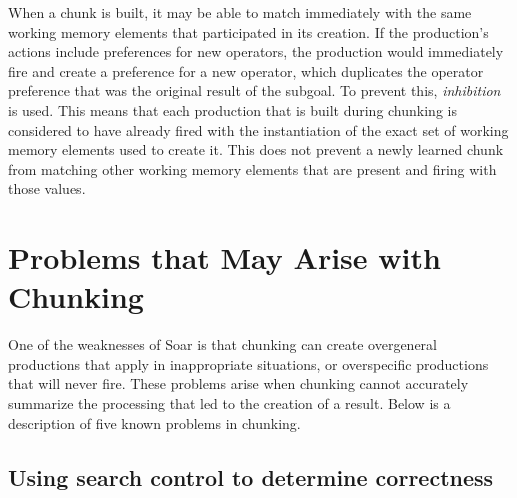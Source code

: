 When a chunk is built, it may be able to match immediately with the same
working memory elements that participated in its creation. If the production's
actions include preferences for new operators, the production would immediately
fire and create a preference for a new operator, which duplicates the 
operator preference
that was the original result of the subgoal. To prevent this,
\emph{inhibition} is used. This means that each production that is built 
during chunking is considered to have already fired with the instantiation of
the exact set of working memory elements used to create it. This does not
prevent a newly learned chunk from matching other working memory elements
that are present and firing with those values.


\section{Problems that May Arise with Chunking}
\label{CHUNKING-problems}




One of the weaknesses of Soar is that chunking can create overgeneral productions
that apply in inappropriate situations, or overspecific productions that will
never fire. These problems arise when chunking cannot accurately summarize the
processing that led to the creation of a result. Below is a description of
five known problems in chunking.

\subsection{Using search control to determine correctness}

